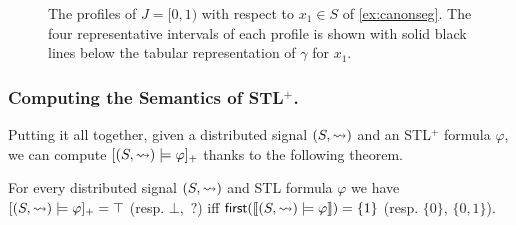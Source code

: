 \begin{wrapfigure}{r}{0.5\textwidth}
	\caption{The profiles of $J = [0,1)$ with respect to $x_1 \in S$ of \cref{ex:canonseg}. The four representative intervals of each profile is shown with solid black lines below the tabular representation of $\gamma$ for $x_1$.}
	\label{fig:profiles}
	\vspace{-4em}
\end{wrapfigure}

\subsubsection{Computing the Semantics of STL$^+$.}

Putting it all together, given a distributed signal $(S, {\rightsquigarrow})$ and an STL$^+$ formula $\varphi$, we can compute $[(S,{\rightsquigarrow}) \models \varphi]_+$ thanks to the following theorem.

\begin{theorem} \label{cl:algo}
	For every distributed signal $(S,{\rightsquigarrow})$ and STL formula $\varphi$ we have $[(S,{\rightsquigarrow}) \models \varphi]_+ = \top$ (resp. $\bot$, ${\,?}$) iff $\textsf{first}(\llbracket (S, {\rightsquigarrow}) \models \varphi \rrbracket) = \{1\}$ (resp. $\{0\}$, $\{0,1\}$).
\end{theorem}

